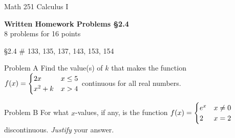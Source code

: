\documentclass[11pt]{report}
\theoremstyle{plain}
\begin{document}
\hfill Math 251 Calculus I
\begin{center}
\Large{\textbf{Written Homework Problems \S 2.4}} \\
8 problems for 16 points\\
\end{center}

\begin{description}
\item{\S 2.4} \# 133, 135, 137, 143, 153, 154
\item{Problem A} Find the value(s) of $k$ that makes the function $f(x)= \begin{cases} 2x & x \leq 5 \cr x^2+k &x>4 \end{cases}$ continuous for all real numbers.

\item{Problem B} For what $x$-values, if any, is the function $f(x)= \begin{cases} e^x & x \not = 0 \cr 2 &x=2 \end{cases}$ discontinuous. \emph{Justify} your answer.
\end{description}
\end{document}
